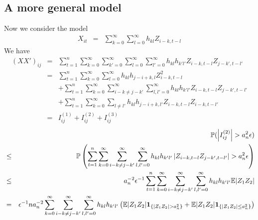 \documentclass{article}
\begin{document}
\subsection{A more general model}
Now we consider the model
\begin{eqnarray*}
  X_{it} &=& \sum_{k=0}^\infty \sum_{l=0}^\infty h_{kl} Z_{i-k,t-l}
\end{eqnarray*}
We have
\begin{eqnarray*}
  (XX')_{ij} &=& \sum_{t=1}^n \sum_{k=0}^\infty \sum_{k'=0}^\infty
  \sum_{l=0}^\infty \sum_{l'=0}^\infty h_{kl} h_{k'l'} Z_{i-k,t-l}
  Z_{j-k',t-l'} \\
  &=& \sum_{t=1}^n \sum_{k=0}^\infty \sum_{l=0}^\infty h_{kl}
  h_{j-i+k,l} Z_{i-k, t-l}^2 \\
  && + \sum_{t=1}^n \sum_{k=0}^\infty \sum_{i-k \neq j-k'}^\infty
  \sum_{l,l'=0}^\infty h_{kl} h_{k'l'} Z_{i-k,t-l} Z_{j-k',t-l'} \\
  && + \sum_{t=1}^n \sum_{k=0}^\infty \sum_{l\neq l'} h_{kl}
  h_{j-i+k, l'} Z_{i-k,t-l} Z_{i-k,t-l'} \\
  &=& I^{(1)}_{ij} + I^{(2)}_{ij} + I^{(3)}_{ij}
\end{eqnarray*}
\begin{eqnarray*}
  && \mathbb{P}(\left| I^{(2)}_{ij} \right| > a_n^2 \epsilon) \\
  &\leq& \mathbb{P}\left(
    \sum_{t=1}^n \sum_{k=0}^\infty \sum_{i-k \neq j-k'}^\infty
    \sum_{l,l'=0}^\infty h_{kl} h_{k'l'} \left|
      Z_{i-k,t-l} Z_{j-k',t-l'} \right| > a_n^2 \epsilon
  \right) \\
  &\leq& a_n^{-2} \epsilon^{-1} \sum_{t=1}^n \sum_{k=0}^\infty \sum_{i-k \neq j-k'}^\infty
    \sum_{l,l'=0}^\infty h_{kl} h_{k'l'} \mathbb{E} |Z_1 Z_2| \\
  &=& \epsilon^{-1} n a_n^{-2} \sum_{k=0}^\infty \sum_{i-k \neq j-k'}^\infty
    \sum_{l,l'=0}^\infty h_{kl} h_{k'l'} \left(
      \mathbb{E} |Z_1 Z_2| \mathbf{1}_{\{|Z_1 Z_2| > a_n^2\}} +
      \mathbb{E} |Z_1 Z_2| \mathbf{1}_{\{|Z_1 Z_2| \leq a_n^2\}}
    \right)
\end{eqnarray*}
\end{document}
